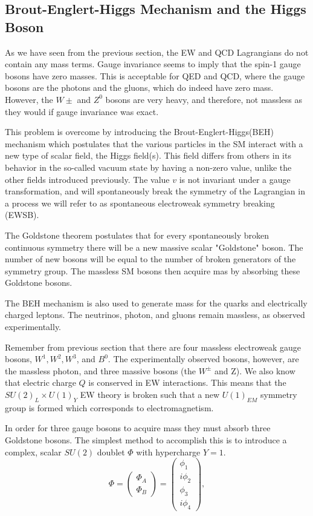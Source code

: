 \subsection{Brout-Englert-Higgs Mechanism and the Higgs Boson}
	
As we have seen from the previous section, the EW and QCD Lagrangians do not contain any mass terms. Gauge invariance seems to imply that the spin-1 gauge bosons have zero masses. This is acceptable for QED and QCD, where the gauge bosons are the photons and the gluons, which do indeed have zero mass. However, the $W\pm$ and $Z^{0}$ bosons are very heavy, and therefore, not massless as they would if gauge invariance was exact.

This problem is overcome by introducing the Brout-Englert-Higgs(BEH) mechanism which postulates that the various particles in the SM interact with a new type of scalar field, the Higgs field(s). This field differs from others in its behavior in the so-called vacuum state by having a non-zero value, unlike the other fields introduced previously. The value $v$ is not invariant under a gauge transformation, and will spontaneously break the symmetry of the Lagrangian in a process we will refer to as spontaneous electroweak symmetry breaking (EWSB).

The Goldstone theorem postulates that for every spontaneously broken continuous symmetry there will be a new massive scalar "Goldstone" boson. The number of new bosons will be equal to the number of broken generators of the symmetry group. The massless SM bosons then acquire mas by absorbing these Goldstone bosons.
	
The BEH mechanism is also used to generate mass for the quarks and electrically charged leptons. The neutrinos, photon, and gluons remain massless, as observed experimentally.
	
Remember from previous section that there are four massless electroweak gauge bosons, $W^{1}, W^{2}, W^{3}$, and $B^{0}$. The experimentally observed bosons, however, are the massless photon, and three massive bosons (the $W^{\pm}$ and Z). We also know that electric charge $Q$ is conserved in EW interactions. This means that the $SU(2)_{L}\times U(1)_{Y}$ EW theory is broken such that a new $U(1)_{EM}$ symmetry group is formed which corresponds to electromagnetism. 
	
In order for three gauge bosons to acquire mass they must absorb three Goldstone bosons. The simplest method to accomplish this is to introduce a complex, scalar $SU(2)$ doublet $\Phi$ with hypercharge $Y=1$.
	\begin{equation}
		\Phi = \begin{pmatrix}
		\Phi_{A} \\
		\Phi_{B}
		\end{pmatrix} = \begin{pmatrix} \phi_{1} \\ i\phi_{2} \\ \phi_{3} \\ i\phi_{4} \end{pmatrix},
	\end{equation}


